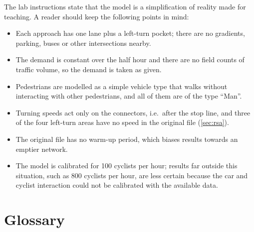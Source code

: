 \documentclass[11pt,a4paper]{article}
\begin{document}
The lab instructions state that the model is a simplification of reality made for teaching. A
reader should keep the following points in mind:
\begin{itemize}
  \item Each approach has one lane plus a left-turn pocket; there are no gradients, parking, buses or
        other intersections nearby.
  \item The demand is constant over the half hour and there are no field counts of traffic volume,
        so the demand is taken as given.
  \item Pedestrians are modelled as a simple vehicle type that walks without interacting with other
        pedestrians, and all of them are of the type ``Man''.
  \item Turning speeds act only on the connectors, i.e.\ after the stop line, and three of the four
        left-turn areas have no speed in the original file (\cref{sec:rsa}).
  \item The original file has no warm-up period, which biases results towards an emptier network.
  \item The model is calibrated for 100 cyclists per hour; results far outside this situation, such as
        800 cyclists per hour, are less certain because the car and cyclist interaction could not be
        calibrated with the available data.
\end{itemize}

\section{Glossary}
\label{sec:glossary}
\end{document}
